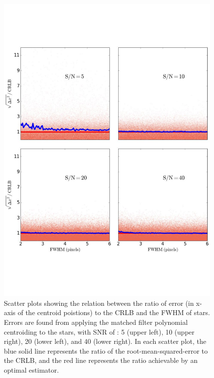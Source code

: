 \begin{figure}[p]~\\
\begin{center}
\includegraphics[width=0.65\linewidth]{figures/centroiding/new_fwhm_matchedfilter.pdf}
\caption{Scatter plots showing the relation between the ratio of error (in x-axis of the centroid poistions) to the CRLB and the FWHM of stars.
Errors are found from applying the matched filter polynomial centroiding to the stars, with SNR  of : 5 (upper left), 10 (upper right), 20 (lower left), and 40 (lower right). In each scatter plot, the blue solid line represents the ratio of the root-mean-squared-error to the CRLB, and the red line represents the ratio achievable by an optimal estimator.}\label{6}
\end{center}
\end{figure}

